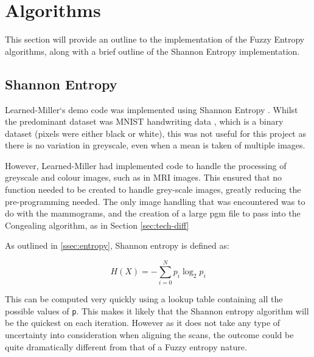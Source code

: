 \section{Algorithms}

This section will provide an outline to the implementation of the Fuzzy Entropy algorithms, along with a brief outline of the Shannon Entropy implementation.

\subsection{Shannon Entropy}
\label{ssec:shannon-entropy}

Learned-Miller`s demo code was implemented using Shannon Entropy \cite{joint-alignment}. Whilst the predominant dataset was MNIST handwriting data \cite{lecun1998gradientbased}, which is a binary dataset (pixels were either black or white), this was not useful for this project as there is no variation in greyscale, even when a mean is taken of multiple images.

However, Learned-Miller had implemented code to handle the processing of greyscale and colour images, such as in MRI images. This ensured that no function needed to be created to handle grey-scale images, greatly reducing the pre-programming needed. The only image handling that was encountered was to do with the mammograms, and the creation of a large pgm file to pass into the \Gls{Congealing} algorithm, as in Section \ref{sec:tech-diff}

As outlined in \ref{ssec:entropy}, Shannon entropy is defined as:

\begin{equation}
  H(X) = - \displaystyle\sum_{i=0}^{N}{p_i \log_2 p_i}
\end{equation}

This can be computed very quickly using a lookup table containing all the possible values of \texttt{p}. This makes it likely that the Shannon entropy algorithm will be the quickest on each iteration. However as it does not take any type of uncertainty into consideration when aligning the scans, the outcome could be quite dramatically different from that of a Fuzzy entropy nature.
